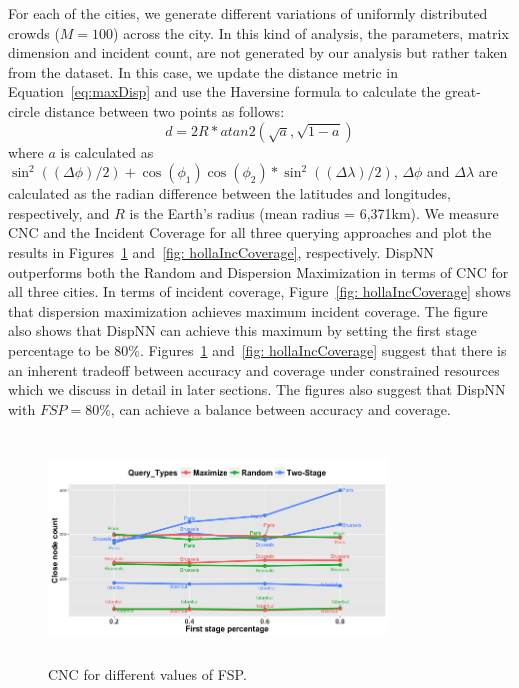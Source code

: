 \documentclass{acm_proc_article-sp}
\begin{document}
For each of the cities, we generate different variations of uniformly distributed crowds ($M = 100$) across the city. In this kind of analysis, the parameters, matrix dimension and incident count, are not generated by our analysis but rather taken from the dataset. In this case, we update the distance metric in Equation~\ref{eq:maxDisp} and use the Haversine formula to calculate the great-circle distance between two points as follows:
\begin{equation} \label{eq:maxDisp2}
d = 2R*atan2(\sqrt{a}, \sqrt{1-a})
\end{equation}
where $a$ is calculated as $ \sin ^2((\Delta \phi)/2 ) + \cos(\phi_1)\cos(\phi_2) * \sin ^2((\Delta \lambda)/2 )$, $\Delta \phi$ and $\Delta \lambda$ are calculated as the radian difference between the latitudes and longitudes, respectively, and $R$ is the Earth's radius (mean radius = 6,371km). We measure CNC and the Incident Coverage for all three querying approaches and plot the results in Figures~\ref{fig: hollaCloseCount} and~\ref{fig: hollaIncCoverage}, respectively. DispNN outperforms both the Random and Dispersion Maximization in terms of CNC for all three cities. In terms of incident coverage, Figure~\ref{fig: hollaIncCoverage} shows that dispersion maximization achieves maximum incident coverage. The figure also shows that DispNN can achieve this maximum by setting the first stage percentage to be $80\%$. Figures~\ref{fig: hollaCloseCount} and~\ref{fig: hollaIncCoverage} suggest that there is an inherent tradeoff between accuracy and coverage under constrained resources which we discuss in detail in later sections. The figures also suggest that DispNN with $FSP = 80\%$, can achieve a balance between accuracy and coverage.\par
\begin{figure}[!h]
\centering
\includegraphics[width=9cm ,height=6cm]{figuresPng/hollaCloseCnt.png}
\caption{CNC for different values of FSP. }
\label{fig: hollaCloseCount}
\end{figure}
\end{document}
